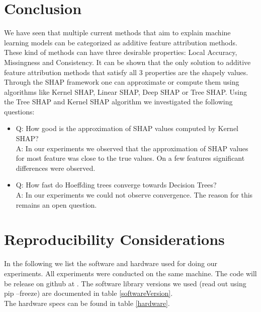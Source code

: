 \documentclass[conference]{IEEEtran}
\begin{document}
\section{Conclusion}
\label{Conclusion}
We have seen that multiple current methods that aim to explain machine learning models can be categorized as additive feature attribution methods. 
These kind of methods can have three desirable properties: Local Accuracy, Missingness and Consistency.
It can be shown that the only solution to additive feature attribution methods that satisfy all 3 properties are the shapely values.
Through the SHAP framework one can approximate or compute them using algorithms like Kernel SHAP, Linear SHAP, Deep SHAP or Tree SHAP.
Using the Tree SHAP and Kernel SHAP algorithm we investigated the following questions:
\begin{itemize}
	\item Q: How good is the approximation of SHAP values computed by Kernel SHAP?\\
		  A: In our experiments we observed that the approximation of SHAP values for most feature was close to the true values. On a few features significant differences were observed.  
	\item Q: How fast do Hoeffding trees converge towards Decision Trees?\\
		  A: In our experiments we could not observe convergence. The reason for this remains an open question.
\end{itemize}

\section{Reproducibility Considerations} 
\label{Reproducibility}

In the following we list the software and hardware used for doing our experiments. 
All experiments were conducted on the same machine.
The code will be release on github at \cite{b17}.
The software library versions we used (read out using pip --freeze) are documented in table \ref{softwareVersion}.\\
 The hardware specs can be found in table \ref{hardware}.\\
\end{document}
